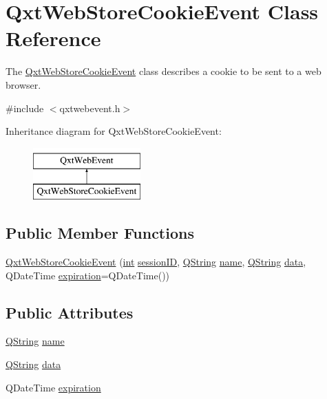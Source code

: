 \hypertarget{class_qxt_web_store_cookie_event}{\section{Qxt\-Web\-Store\-Cookie\-Event Class Reference}
\label{class_qxt_web_store_cookie_event}
}


The \hyperlink{class_qxt_web_store_cookie_event}{Qxt\-Web\-Store\-Cookie\-Event} class describes a cookie to be sent to a web browser.  




{\ttfamily \#include $<$qxtwebevent.\-h$>$}

Inheritance diagram for Qxt\-Web\-Store\-Cookie\-Event\-:\begin{figure}[H]
\begin{center}
\leavevmode
\includegraphics[height=2.000000cm]{class_qxt_web_store_cookie_event}
\end{center}
\end{figure}
\subsection*{Public Member Functions}
\begin{DoxyCompactItemize}
\item 
\hyperlink{class_qxt_web_store_cookie_event_a758ab499243ec1c274b3b1b70c224893}{Qxt\-Web\-Store\-Cookie\-Event} (\hyperlink{ioapi_8h_a787fa3cf048117ba7123753c1e74fcd6}{int} \hyperlink{class_qxt_web_event_a3fdb1d80c46e535c2c79a06269a5d307}{session\-I\-D}, \hyperlink{group___u_a_v_objects_plugin_gab9d252f49c333c94a72f97ce3105a32d}{Q\-String} \hyperlink{glext_8h_ad977737dfc9a274a62741b9500c49a32}{name}, \hyperlink{group___u_a_v_objects_plugin_gab9d252f49c333c94a72f97ce3105a32d}{Q\-String} \hyperlink{glext_8h_a8850df0785e6fbcc2351af3b686b8c7a}{data}, Q\-Date\-Time \hyperlink{class_qxt_web_store_cookie_event_af6639c461349865d17bcb1329467fe85}{expiration}=Q\-Date\-Time())
\end{DoxyCompactItemize}
\subsection*{Public Attributes}
\begin{DoxyCompactItemize}
\item 
\hyperlink{group___u_a_v_objects_plugin_gab9d252f49c333c94a72f97ce3105a32d}{Q\-String} \hyperlink{class_qxt_web_store_cookie_event_a7959bd008a7e8d50b7b44451ff7bc0c7}{name}
\item 
\hyperlink{group___u_a_v_objects_plugin_gab9d252f49c333c94a72f97ce3105a32d}{Q\-String} \hyperlink{class_qxt_web_store_cookie_event_ae0a064ada0cec351fa94632c6d0b8482}{data}
\item 
Q\-Date\-Time \hyperlink{class_qxt_web_store_cookie_event_af6639c461349865d17bcb1329467fe85}{expiration}
\end{DoxyCompactItemize}
